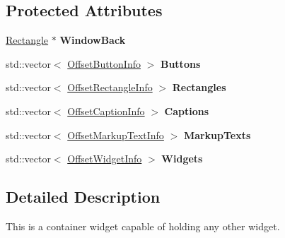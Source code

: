 \subsection*{Protected Attributes}
\begin{DoxyCompactItemize}
\item 
\hypertarget{classphys_1_1UI_1_1Window_a91635b1e1a94e74e76ebfe61611d1daf}{
\hyperlink{classphys_1_1UI_1_1Rectangle}{Rectangle} $\ast$ {\bfseries WindowBack}}
\label{d4/d86/classphys_1_1UI_1_1Window_a91635b1e1a94e74e76ebfe61611d1daf}

\item 
\hypertarget{classphys_1_1UI_1_1Window_a5fccbc2f8975e9a60b4b7c6d5eca4844}{
std::vector$<$ \hyperlink{structphys_1_1UI_1_1ResizingInfo}{OffsetButtonInfo} $>$ {\bfseries Buttons}}
\label{d4/d86/classphys_1_1UI_1_1Window_a5fccbc2f8975e9a60b4b7c6d5eca4844}

\item 
\hypertarget{classphys_1_1UI_1_1Window_a556a43730021df62a867af76a03069b0}{
std::vector$<$ \hyperlink{structphys_1_1UI_1_1ResizingInfo}{OffsetRectangleInfo} $>$ {\bfseries Rectangles}}
\label{d4/d86/classphys_1_1UI_1_1Window_a556a43730021df62a867af76a03069b0}

\item 
\hypertarget{classphys_1_1UI_1_1Window_acaa4a2954c71b6a9ea6edb1941ca053d}{
std::vector$<$ \hyperlink{structphys_1_1UI_1_1ResizingInfo}{OffsetCaptionInfo} $>$ {\bfseries Captions}}
\label{d4/d86/classphys_1_1UI_1_1Window_acaa4a2954c71b6a9ea6edb1941ca053d}

\item 
\hypertarget{classphys_1_1UI_1_1Window_ac50afa68d42e2f30ea5d470b03be4786}{
std::vector$<$ \hyperlink{structphys_1_1UI_1_1ResizingInfo}{OffsetMarkupTextInfo} $>$ {\bfseries MarkupTexts}}
\label{d4/d86/classphys_1_1UI_1_1Window_ac50afa68d42e2f30ea5d470b03be4786}

\item 
\hypertarget{classphys_1_1UI_1_1Window_a2fc4fb5f39925eff948c8cb61f9a724f}{
std::vector$<$ \hyperlink{structphys_1_1UI_1_1ResizingInfo}{OffsetWidgetInfo} $>$ {\bfseries Widgets}}
\label{d4/d86/classphys_1_1UI_1_1Window_a2fc4fb5f39925eff948c8cb61f9a724f}

\end{DoxyCompactItemize}


\subsection{Detailed Description}
This is a container widget capable of holding any other widget. 

